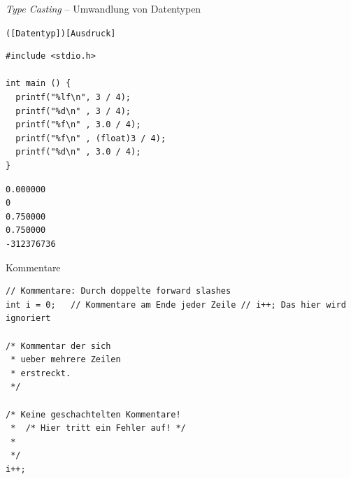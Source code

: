 \begin{frame}[fragile]{\emph{Type Casting} -- Umwandlung von Datentypen}
\begin{codebox}[Syntaxelement]
\footnotesize\texttt{([Datentyp])[Ausdruck]}
\end{codebox}
%
%
\begin{codebox}[Beispiel]
\begin{verbatim}
#include <stdio.h>

int main () {
  printf("%lf\n", 3 / 4);
  printf("%d\n" , 3 / 4);
  printf("%f\n" , 3.0 / 4);
  printf("%f\n" , (float)3 / 4);
  printf("%d\n" , 3.0 / 4);
}
\end{verbatim}
\end{codebox}
%
\begin{cmdbox}[Ausgabe]
\vspace{3pt}
\begin{verbatim}
0.000000
0
0.750000
0.750000
-312376736
\end{verbatim}
\vspace{3pt}
\end{cmdbox}
%
\end{frame}


\begin{frame}[fragile]{Kommentare}
%
\begin{codebox}[Beispiel]
\begin{verbatim}
// Kommentare: Durch doppelte forward slashes
int i = 0;   // Kommentare am Ende jeder Zeile // i++; Das hier wird ignoriert

/* Kommentar der sich
 * ueber mehrere Zeilen
 * erstreckt.
 */

/* Keine geschachtelten Kommentare!
 *  /* Hier tritt ein Fehler auf! */
 *
 */
i++;
\end{verbatim}
\end{codebox}
%
\end{frame}


